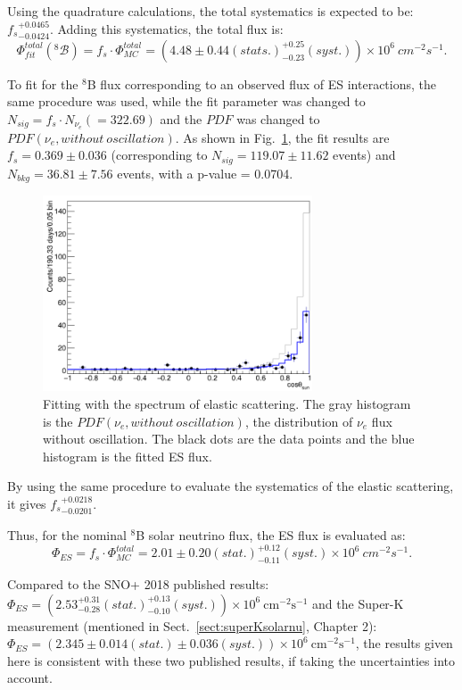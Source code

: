 Using the quadrature calculations, the total systematics is expected to be: ${f_s}^{+0.0465}_{-0.0424}$. Adding this systematics, the total flux is:
\begin{equation}
\Phi^{total}_{fit}(\mathcal{^8 B})=f_s\cdot \Phi^{total}_{MC}=(4.48\pm 0.44(stats.)^{+0.25}_{-0.23}(syst.))\times 10^6~cm^{-2}s^{-1}.
\end{equation}

To fit for the $^8$B flux corresponding to an observed flux of ES interactions, the same procedure was used, while the fit parameter was changed to $N_{sig}=f_s\cdot N_{\nu_e}(=322.69)$ and the $PDF$ was changed to $PDF(\nu_e,without~oscillation)$. As shown in Fig.~\ref{fig:ESfluxFit}, the fit results are $f_s=0.369\pm 0.036$ (corresponding to $N_{sig}=119.07\pm11.62$ events) and $N_{bkg}=36.81\pm 7.56$ events, with a p-value = 0.0704.

\begin{figure}[!htb]
	\centering
	\includegraphics[width=8cm]{ESfluxFit.png}
	\caption[Fitting with the spectrum of elastic scattering.]{Fitting with the spectrum of elastic scattering. The gray histogram is the $PDF(\nu_e,without~oscillation)$, the distribution of $\nu_e$ flux without oscillation. The black dots are the data points and the blue histogram is the fitted ES flux.}
	\label{fig:ESfluxFit}
\end{figure}

By using the same procedure to evaluate the systematics of the elastic scattering, it gives ${f_s}^{+0.0218}_{-0.0201}$.

Thus, for the nominal $^8$B solar neutrino flux, the ES flux is evaluated as:
\begin{equation}
\Phi_{ES}=f_s\cdot \Phi^{total}_{MC}=2.01\pm 0.20(stat.)^{+0.12}_{-0.11} (syst.)\times 10^6~cm^{-2}s^{-1}.
\end{equation}

Compared to the SNO+ 2018 published results: $\Phi_{ES}=(2.53^{+0.31}_{-0.28}(stat.)^{+0.13}_{-0.10}(syst.))\times \mathrm{10^6~cm^{-2}s^{-1}}$\cite{anderson2019measurement} and the Super-K measurement (mentioned in Sect.~\ref{sect:superKsolarnu}, Chapter 2): $\Phi_{ES}=(2.345\pm0.014(stat.)\pm 0.036(syst.))\times \mathrm{10^6~cm^{-2}s^{-1}}$\cite{abe2016solar}, the results given here is consistent with these two published results, if taking the uncertainties into account. 

